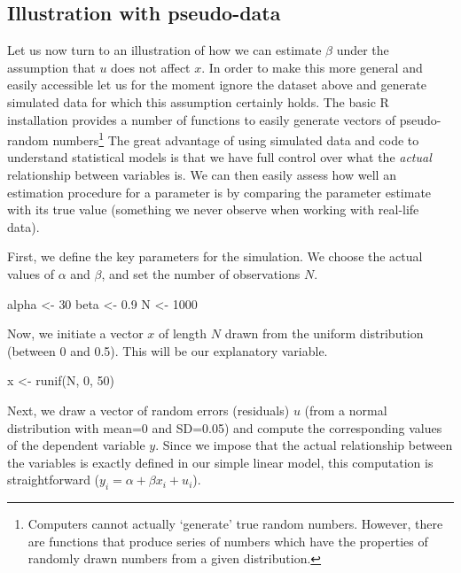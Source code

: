 \documentclass[
  12pt,
]{style/krantz}
\newenvironment{Shaded}{\begin{snugshade}}{\end{snugshade}}
\newcommand{\DecValTok}[1]{\textcolor[rgb]{0.00,0.00,0.81}{#1}}
\newcommand{\FloatTok}[1]{\textcolor[rgb]{0.00,0.00,0.81}{#1}}
\newcommand{\FunctionTok}[1]{\textcolor[rgb]{0.00,0.00,0.00}{#1}}
\newcommand{\NormalTok}[1]{#1}
\newcommand{\OtherTok}[1]{\textcolor[rgb]{0.56,0.35,0.01}{#1}}
\begin{document}
\hypertarget{illustration-with-pseudo-data}{%
\subsection{Illustration with pseudo-data}\label{illustration-with-pseudo-data}}

Let us now turn to an illustration of how we can estimate \(\beta\) under the assumption that \(u\) does not affect \(x\). In order to make this more general and easily accessible let us for the moment ignore the dataset above and generate simulated data for which this assumption certainly holds. The basic R installation provides a number of functions to easily generate vectors of pseudo-random numbers\footnote{Computers cannot actually `generate' true random numbers. However, there are functions that produce series of numbers which have the properties of randomly drawn numbers from a given distribution.} The great advantage of using simulated data and code to understand statistical models is that we have full control over what the \emph{actual} relationship between variables is. We can then easily assess how well an estimation procedure for a parameter is by comparing the parameter estimate with its true value (something we never observe when working with real-life data).

First, we define the key parameters for the simulation. We choose the actual values of \(\alpha\) and \(\beta\), and set the number of observations \(N\).

\begin{Shaded}
\begin{Highlighting}[]
\NormalTok{alpha }\OtherTok{\textless{}{-}} \DecValTok{30}
\NormalTok{beta }\OtherTok{\textless{}{-}} \FloatTok{0.9}
\NormalTok{N }\OtherTok{\textless{}{-}} \DecValTok{1000}
\end{Highlighting}
\end{Shaded}

Now, we initiate a vector \(x\) of length \(N\) drawn from the uniform distribution (between 0 and 0.5). This will be our explanatory variable.

\begin{Shaded}
\begin{Highlighting}[]
\NormalTok{x }\OtherTok{\textless{}{-}} \FunctionTok{runif}\NormalTok{(N, }\DecValTok{0}\NormalTok{, }\DecValTok{50}\NormalTok{)}
\end{Highlighting}
\end{Shaded}

Next, we draw a vector of random errors (residuals) \(u\) (from a normal distribution with mean=0 and SD=0.05) and compute the corresponding values of the dependent variable \(y\). Since we impose that the actual relationship between the variables is exactly defined in our simple linear model, this computation is straightforward (\(y_{i}= \alpha + \beta x_{i} + u_{i}\)).
\end{document}
